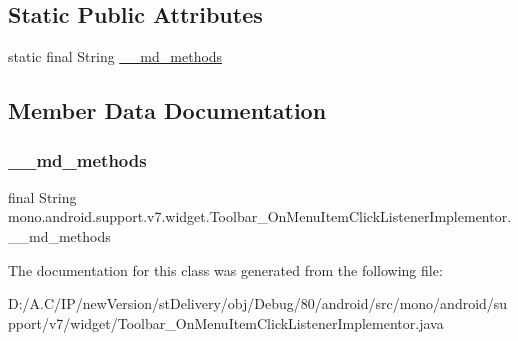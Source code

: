\subsection*{Static Public Attributes}
\begin{DoxyCompactItemize}
\item 
static final String \hyperlink{classmono_1_1android_1_1support_1_1v7_1_1widget_1_1_toolbar___on_menu_item_click_listener_implementor_ae2a6ab2c5121d74c0a12e594c68ddb43}{\+\_\+\+\_\+md\+\_\+methods}
\end{DoxyCompactItemize}


\subsection{Member Data Documentation}
\mbox{\label{classmono_1_1android_1_1support_1_1v7_1_1widget_1_1_toolbar___on_menu_item_click_listener_implementor_ae2a6ab2c5121d74c0a12e594c68ddb43}} 
\subsubsection{\texorpdfstring{\+\_\+\+\_\+md\+\_\+methods}{\_\_md\_methods}}
{\footnotesize\ttfamily final String mono.\+android.\+support.\+v7.\+widget.\+Toolbar\+\_\+\+On\+Menu\+Item\+Click\+Listener\+Implementor.\+\_\+\+\_\+md\+\_\+methods\hspace{0.3cm}{\ttfamily [static]}}



The documentation for this class was generated from the following file\+:\begin{DoxyCompactItemize}
\item 
D\+:/\+A.\+C/\+I\+P/new\+Version/st\+Delivery/obj/\+Debug/80/android/src/mono/android/support/v7/widget/Toolbar\+\_\+\+On\+Menu\+Item\+Click\+Listener\+Implementor.\+java\end{DoxyCompactItemize}
